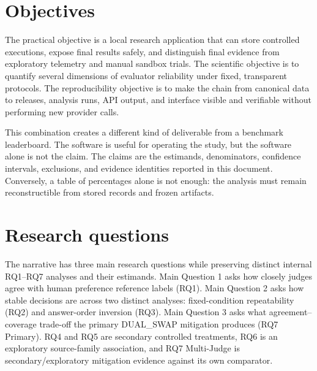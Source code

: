\section{Objectives}

The practical objective is a local research application that can store controlled executions, expose final results safely, and distinguish final evidence from exploratory telemetry and manual sandbox trials. The scientific objective is to quantify several dimensions of evaluator reliability under fixed, transparent protocols. The reproducibility objective is to make the chain from canonical data to releases, analysis runs, API output, and interface visible and verifiable without performing new provider calls.

This combination creates a different kind of deliverable from a benchmark leaderboard. The software is useful for operating the study, but the software alone is not the claim. The claims are the estimands, denominators, confidence intervals, exclusions, and evidence identities reported in this document. Conversely, a table of percentages alone is not enough: the analysis must remain reconstructible from stored records and frozen artifacts.

\section{Research questions}

The narrative has three main research questions while preserving distinct internal RQ1--RQ7 analyses and their estimands. Main Question 1 asks how closely judges agree with human preference reference labels (RQ1). Main Question 2 asks how stable decisions are across two distinct analyses: fixed-condition repeatability (RQ2) and answer-order inversion (RQ3). Main Question 3 asks what agreement--coverage trade-off the primary DUAL\_SWAP mitigation produces (RQ7 Primary). RQ4 and RQ5 are secondary controlled treatments, RQ6 is an exploratory source-family association, and RQ7 Multi-Judge is secondary/exploratory mitigation evidence against its own comparator.

